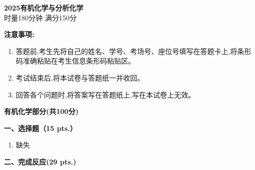 \begin{center}
    {\LARGE \textbf{2025有机化学与分析化学}} \\[2ex]
    {\large 时量180分钟 \quad 满分150分}
\end{center}

\vspace{0.5cm}
\noindent\textbf{注意事项:}
\begin{enumerate}[label=\arabic*., parsep=0pt, itemsep=0pt]
    \item 答题前,考生先将自己的姓名、学号、考场号、座位号填写在答题卡上,将条形码准确粘贴在考生信息条形码粘贴区。
    \item 考试结束后,将本试卷与答题纸一并收回。
    \item 回答各个问题时,将答案写在答题纸上,写在本试卷上无效。
\end{enumerate}

\vspace{1cm}
\begin{center}
    {\Large \textbf{有机化学部分(共100分)}}
\end{center}

\vspace{0.5cm}
\noindent\textbf{一、选择题（15 pts.）}

\begin{enumerate}[label=\arabic*., itemsep=1.5ex]
    \item 缺失
\end{enumerate}

\vspace{0.5cm}
\noindent\textbf{二、完成反应(29 pts.)}

